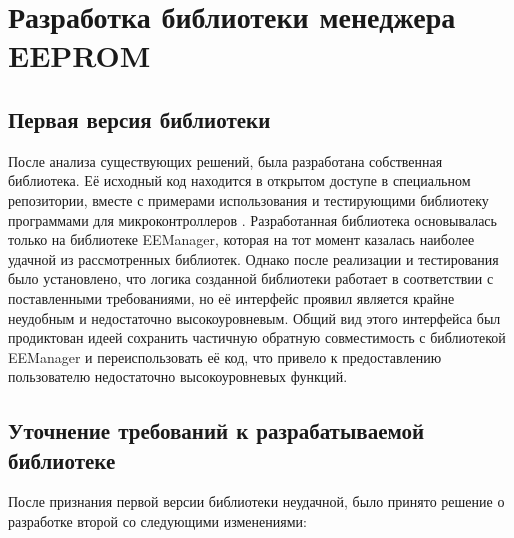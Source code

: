 \chapter{Разработка библиотеки менеджера EEPROM}

\section{Первая версия библиотеки}

После анализа существующих решений, была разработана собственная библиотека.
Её исходный код находится в открытом доступе в специальном репозитории, вместе с примерами использования и тестирующими библиотеку программами для микроконтроллеров \cite{web:my-eemanager}.
Разработанная библиотека основывалась только на библиотеке EEManager, которая на тот момент казалась наиболее удачной из рассмотренных библиотек.
Однако после реализации и тестирования было установлено, что логика созданной библиотеки работает в соответствии с поставленными требованиями, но её интерфейс проявил является крайне неудобным и недостаточно высокоуровневым.
Общий вид этого интерфейса был продиктован идеей сохранить частичную обратную совместимость с библиотекой EEManager и переиспользовать её код, что привело к предоставлению пользователю недостаточно высокоуровневых функций.


\section{Уточнение требований к разрабатываемой библиотеке}

После признания первой версии библиотеки неудачной, было принято решение о разработке второй со следующими изменениями:

